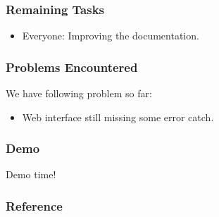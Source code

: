 \documentclass{beamer}
\begin{document}
\begin{frame}
  \frametitle{Remaining Tasks}
  \begin{itemize}
    \item Everyone: Improving the documentation. 
  \end{itemize}
\end{frame}

\begin{frame}
  \frametitle{Problems Encountered}
  We have following problem so far:
  \begin{itemize}
    \item Web interface still missing some error catch.
  \end{itemize}
\end{frame}


\begin{frame}
  \frametitle{Demo}
  Demo time!
\end{frame}

\begin{frame}
  \frametitle{Reference}
    \printbibliography
\end{frame}
\end{document}
